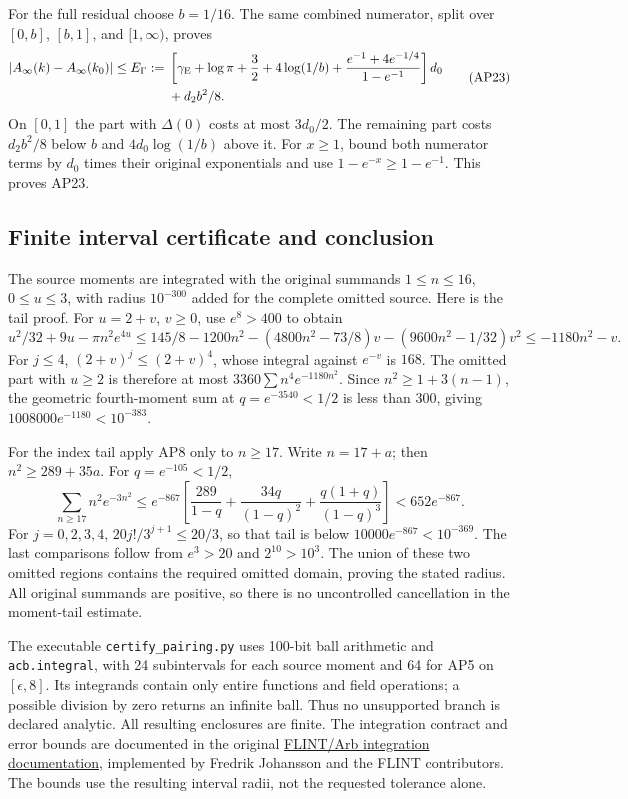 For the full residual choose \(b=1/16\). The same combined
numerator, split over \([0,b]\), \([b,1]\), and \([1,\infty)\),
proves
\[
\begin{split}
 |A_\infty(k)-A_\infty(k_0)|\le E_\Gamma:={}&
 \left[\gamma_{\rm E}+\log\pi+\frac32+4\log(1/b)
 +\frac{e^{-1}+4e^{-1/4}}{1-e^{-1}}\right]d_0\\
 &{}+d_2b^2/8.
\end{split}\tag{AP23}
\]
On \([0,1]\) the part with \(\Delta(0)\) costs at most
\(3d_0/2\). The remaining part costs \(d_2b^2/8\) below
\(b\) and \(4d_0\log(1/b)\) above it. For \(x\ge1\),
bound both numerator terms by \(d_0\) times their original
exponentials and use \(1-e^{-x}\ge1-e^{-1}\). This proves AP23.

\subsection{Finite interval certificate and conclusion}
The source moments are integrated with the original summands
\(1\le n\le16\), \(0\le u\le3\), with radius \(10^{-300}\)
added for the complete omitted source. Here is the tail proof.
For \(u=2+v\), \(v\ge0\), use \(e^8>400\) to obtain
\[
 u^2/32+9u-\pi n^2e^{4u}
 \le145/8-1200n^2-(4800n^2-73/8)v
                  -(9600n^2-1/32)v^2
 \le-1180n^2-v.
\]
For \(j\le4\), \((2+v)^j\le(2+v)^4\), whose integral against
\(e^{-v}\) is \(168\). The omitted part with \(u\ge2\) is
therefore at most \(3360\sum n^4e^{-1180n^2}\).
Since \(n^2\ge1+3(n-1)\), the geometric fourth-moment sum at
\(q=e^{-3540}<1/2\) is less than \(300\), giving
\(1008000e^{-1180}<10^{-383}\).

For the index tail apply AP8 only to \(n\ge17\). Write \(n=17+a\);
then \(n^2\ge289+35a\). For \(q=e^{-105}<1/2\),
\[
 \sum_{n\ge17}n^2e^{-3n^2}
 \le e^{-867}\left[\frac{289}{1-q}
       +\frac{34q}{(1-q)^2}+\frac{q(1+q)}{(1-q)^3}\right]
 <652e^{-867}.
\]
For \(j=0,2,3,4\), \(20j!/3^{j+1}\le20/3\), so that tail
is below \(10000e^{-867}<10^{-369}\). The last comparisons follow
from \(e^3>20\) and \(2^{10}>10^3\). The union of these two
omitted regions contains the required omitted domain, proving the
stated radius. All original summands are positive, so there is no
uncontrolled cancellation in the moment-tail estimate.

The executable \texttt{certify\_pairing.py} uses 100-bit ball arithmetic
and \texttt{acb.integral}, with 24 subintervals for each source moment
and 64 for AP5 on \([\epsilon,8]\). Its integrands contain only
entire functions and field operations; a possible division by zero
returns an infinite ball. Thus no unsupported branch is declared
analytic. All resulting enclosures are finite. The integration
contract and error bounds are documented in the original
\href{https://raw.githubusercontent.com/flintlib/flint/master/doc/source/acb_calc.rst}{
FLINT/Arb integration documentation}, implemented by Fredrik Johansson
and the FLINT contributors. The bounds use the resulting interval
radii, not the requested tolerance alone.

